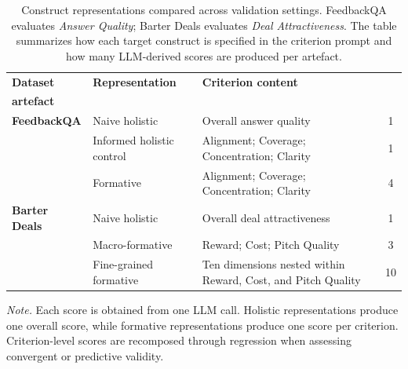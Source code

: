 
\begin{table}[!h]
\centering
\small
\caption{Construct representations compared across validation settings. FeedbackQA evaluates \textit{Answer Quality}; Barter Deals evaluates \textit{Deal Attractiveness}. The table summarizes how each target construct is specified in the criterion prompt and how many LLM-derived scores are produced per artefact.}
\label{tab:construct_representations}
\begin{tabularx}{\textwidth}{@{} 
    l 
    >{\raggedright\arraybackslash}p{3.8cm} 
    >{\raggedright\arraybackslash}X 
    c 
    @{}}
\toprule
\textbf{Dataset} & \textbf{Representation} & \textbf{Criterion content} & \begin{tabular}{@{}c@{}}\textbf{Scores /} \\ \textbf{artefact}\end{tabular} \\
\midrule
\textbf{FeedbackQA} 
& Naive holistic 
& Overall answer quality 
& 1 \\
\addlinespace
& Informed holistic control 
& Alignment; Coverage; Concentration; Clarity 
& 1 \\
\addlinespace
& Formative 
& Alignment; Coverage; Concentration; Clarity 
& 4 \\

\midrule

\textbf{Barter Deals} 
& Naive holistic 
& Overall deal attractiveness 
& 1 \\
\addlinespace
& Macro-formative 
& Reward; Cost; Pitch Quality 
& 3 \\
\addlinespace
& Fine-grained formative 
& Ten dimensions nested within Reward, Cost, and Pitch Quality 
& 10 \\
\bottomrule
\end{tabularx}

\vspace{0.15cm}
\begin{flushleft}
\footnotesize
\textit{Note.} Each score is obtained from one LLM call. Holistic representations produce one overall score, while formative representations produce one score per criterion. Criterion-level scores are recomposed through regression when assessing convergent or predictive validity.
\end{flushleft}
\end{table}

